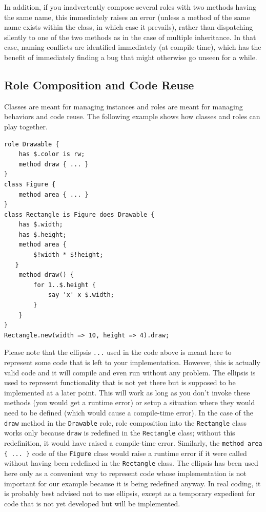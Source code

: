 
In addition, if you inadvertently compose several roles with 
two methods having the same name, this immediately raises 
an error (unless a method of the same name exists within the 
class, in which case it prevails), rather than dispatching 
silently to one of the two methods as in the case of multiple 
inheritance. In that case, naming conflicts are identified 
immediately (at compile time), which has the benefit of 
immediately finding a bug that might otherwise go 
unseen for a while.

\subsection{Role Composition and Code Reuse}

Classes are meant for managing instances and roles are 
meant for managing behaviors and code reuse. The following 
example shows how classes and roles can play together.

\begin{verbatim}
role Drawable {
    has $.color is rw;
    method draw { ... }
}
class Figure {
    method area { ... }
}
class Rectangle is Figure does Drawable {
    has $.width;
    has $.height;
    method area {
        $!width * $!height;
   }
    method draw() {
        for 1..$.height {
            say 'x' x $.width;
        }
    }
}
Rectangle.new(width => 10, height => 4).draw;
\end{verbatim}

Please note that the ellipsis \verb'...' used in the code 
above is meant here to represent some code that is left 
to your implementation. However, this is actually valid code 
and it will compile and even run without any problem. The 
ellipsis is used to represent functionality that is not yet 
there but is supposed to be implemented at a later point. This 
will work as long as you don't invoke these methods (you would 
get a runtime error) or setup a situation where they would 
need to be defined (which would cause a compile-time error). 
In the case of the {\tt draw} method in the 
{\tt Drawable} role, role composition into the {\tt Rectangle} 
class works only because {\tt draw} is redefined in the 
{\tt Rectangle} class; without this redefinition, it would 
have raised a compile-time error. Similarly, 
the \verb'method area { ... }' 
code of the {\tt Figure} class would raise a runtime error if it 
were called without having been redefined in the {\tt Rectangle} 
class. The ellipsis has been used here only as a convenient way 
to represent code whose implementation is not important for 
our example because it is being redefined anyway. In real coding, 
it is probably best advised not to use ellipsis, except as a 
temporary expedient for code that is not yet developed but
will be implemented.

